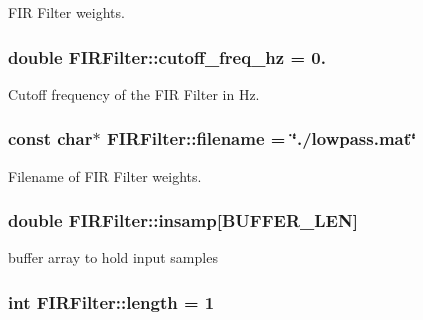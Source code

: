 F\+IR Filter weights. 

\subsubsection[{\texorpdfstring{cutoff\+\_\+freq\+\_\+hz}{cutoff_freq_hz}}]{\setlength{\rightskip}{0pt plus 5cm}double F\+I\+R\+Filter\+::cutoff\+\_\+freq\+\_\+hz = 0.}\hypertarget{classFIRFilter_a038a40d113cdbcdef9d215f79d5e22bf}{}\label{classFIRFilter_a038a40d113cdbcdef9d215f79d5e22bf}


Cutoff frequency of the F\+IR Filter in Hz. 

\subsubsection[{\texorpdfstring{filename}{filename}}]{\setlength{\rightskip}{0pt plus 5cm}const char$\ast$ F\+I\+R\+Filter\+::filename = \char`\"{}./lowpass.\+mat\char`\"{}}\hypertarget{classFIRFilter_af15d0e43051eb388273fe4b575e7e791}{}\label{classFIRFilter_af15d0e43051eb388273fe4b575e7e791}


Filename of F\+IR Filter weights. 

\subsubsection[{\texorpdfstring{insamp}{insamp}}]{\setlength{\rightskip}{0pt plus 5cm}double F\+I\+R\+Filter\+::insamp\mbox{[}{\bf B\+U\+F\+F\+E\+R\+\_\+\+L\+EN}\mbox{]}}\hypertarget{classFIRFilter_a3998b6c0cda5c66c708238ee679c415e}{}\label{classFIRFilter_a3998b6c0cda5c66c708238ee679c415e}


buffer array to hold input samples 

\subsubsection[{\texorpdfstring{length}{length}}]{\setlength{\rightskip}{0pt plus 5cm}int F\+I\+R\+Filter\+::length = 1}\hypertarget{classFIRFilter_a4e697a78993656c942005939a3439b3f}{}\label{classFIRFilter_a4e697a78993656c942005939a3439b3f}
